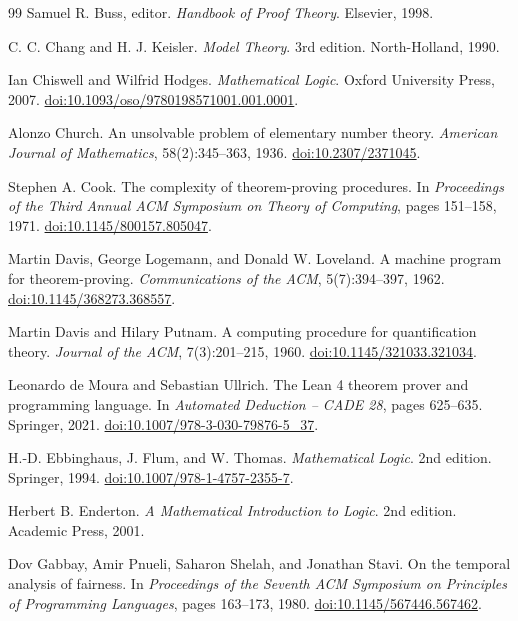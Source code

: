 \begin{thebibliography}{99}
Samuel R. Buss, editor.
\emph{Handbook of Proof Theory}.
Elsevier, 1998.

C. C. Chang and H. J. Keisler.
\emph{Model Theory}. 3rd edition.
North-Holland, 1990.

Ian Chiswell and Wilfrid Hodges.
\emph{Mathematical Logic}.
Oxford University Press, 2007.
\href{https://doi.org/10.1093/oso/9780198571001.001.0001}{doi:10.1093/oso/9780198571001.001.0001}.

Alonzo Church.
An unsolvable problem of elementary number theory.
\emph{American Journal of Mathematics}, 58(2):345--363, 1936.
\href{https://doi.org/10.2307/2371045}{doi:10.2307/2371045}.

Stephen A. Cook.
The complexity of theorem-proving procedures.
In \emph{Proceedings of the Third Annual ACM Symposium on Theory of Computing},
pages 151--158, 1971.
\href{https://doi.org/10.1145/800157.805047}{doi:10.1145/800157.805047}.

Martin Davis, George Logemann, and Donald W. Loveland.
A machine program for theorem-proving.
\emph{Communications of the ACM}, 5(7):394--397, 1962.
\href{https://doi.org/10.1145/368273.368557}{doi:10.1145/368273.368557}.

Martin Davis and Hilary Putnam.
A computing procedure for quantification theory.
\emph{Journal of the ACM}, 7(3):201--215, 1960.
\href{https://doi.org/10.1145/321033.321034}{doi:10.1145/321033.321034}.

Leonardo de Moura and Sebastian Ullrich.
The Lean 4 theorem prover and programming language.
In \emph{Automated Deduction -- CADE 28}, pages 625--635. Springer, 2021.
\href{https://doi.org/10.1007/978-3-030-79876-5_37}{doi:10.1007/978-3-030-79876-5\_37}.

H.-D. Ebbinghaus, J. Flum, and W. Thomas.
\emph{Mathematical Logic}. 2nd edition.
Springer, 1994.
\href{https://doi.org/10.1007/978-1-4757-2355-7}{doi:10.1007/978-1-4757-2355-7}.

Herbert B. Enderton.
\emph{A Mathematical Introduction to Logic}. 2nd edition.
Academic Press, 2001.

Dov Gabbay, Amir Pnueli, Saharon Shelah, and Jonathan Stavi.
On the temporal analysis of fairness.
In \emph{Proceedings of the Seventh ACM Symposium on Principles of
Programming Languages}, pages 163--173, 1980.
\href{https://doi.org/10.1145/567446.567462}{doi:10.1145/567446.567462}.


\end{thebibliography}
